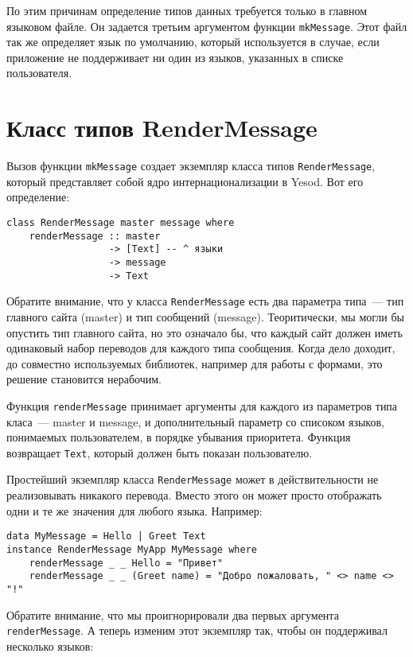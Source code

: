 По этим причинам определение типов данных требуется только в главном языковом файле. Он задается третьим аргументом функции \lstinline'mkMessage'. Этот файл так же определяет язык по умолчанию, который используется в случае, если приложение не поддерживает ни один из языков, указанных в списке пользователя.

\section{Класс типов RenderMessage} %

Вызов функции \lstinline'mkMessage' создает экземпляр класса типов \lstinline'RenderMessage', который представляет собой ядро интернационализации в Yesod. Вот его определение:

\begin{lstlisting}
class RenderMessage master message where
    renderMessage :: master
                  -> [Text] -- ^ языки
                  -> message
                  -> Text 
\end{lstlisting}

Обратите внимание, что у класса \lstinline'RenderMessage' есть два параметра типа~--- тип главного сайта (master) и тип сообщений (message). Теоритически, мы могли бы опустить тип главного сайта, но это означало бы, что каждый сайт должен иметь одинаковый набор переводов для каждого типа сообщения. Когда дело доходит, до совместно используемых библиотек, например для работы с формами, это решение становится нерабочим.

Функция \lstinline'renderMessage' принимает аргументы для каждого из параметров типа класа~--- master и message, и дополнительный параметр со списоком языков, понимаемых пользователем, в порядке убывания приоритета. Функция возвращает \lstinline'Text', который должен быть показан пользователю.

Простейший экземпляр класса \lstinline'RenderMessage' может в действительности не реализовывать никакого перевода. Вместо этого он может просто отображать одни и те же значения для любого языка. Например:

\begin{lstlisting}
data MyMessage = Hello | Greet Text
instance RenderMessage MyApp MyMessage where
    renderMessage _ _ Hello = "Привет"
    renderMessage _ _ (Greet name) = "Добро пожаловать, " <> name <> "!"
\end{lstlisting}
    
Обратите внимание, что мы проигнорировали два первых аргумента \lstinline'renderMessage'. А теперь изменим этот экземпляр так, чтобы он поддерживал несколько языков:


